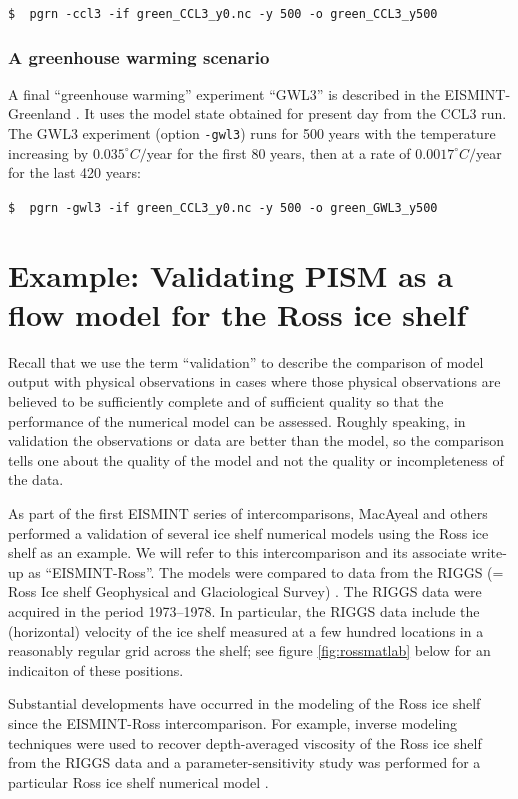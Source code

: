 \documentclass[11pt,final]{amsart}
\begin{document}
\verb|$  pgrn -ccl3 -if green_CCL3_y0.nc -y 500 -o green_CCL3_y500|

\subsubsection*{A greenhouse warming scenario}  A final ``greenhouse warming'' experiment ``GWL3'' is described in the EISMINT-Greenland \cite{RitzEISMINT}.  It uses the model state obtained for present day from the CCL3 run.  The GWL3 experiment (option \verb|-gwl3|) runs for 500 years with the temperature increasing by $0.035^\circ C/$year for the first 80 years, then at a rate of $0.0017^\circ C/$year for the last 420 years:

\verb|$  pgrn -gwl3 -if green_CCL3_y0.nc -y 500 -o green_GWL3_y500|



\clearpage\newpage
\section{Example: Validating PISM as a flow model for the Ross ice shelf}\label{sect:ross}  Recall that we use the term ``validation'' to describe the comparison of model output with physical observations in cases where those physical observations are believed to be sufficiently complete and of sufficient quality so that the performance of the numerical model can be assessed.  Roughly speaking, in validation the observations or data are better than the model, so the comparison tells one about the quality of the model and not the quality or incompleteness of the data.

As part of the first EISMINT series of intercomparisons, MacAyeal and others \cite{MacAyealetal} performed a validation of several ice shelf numerical models using the Ross ice shelf as an example.  We will refer to this intercomparison and its associate write-up \cite{MacAyealetal} as ``EISMINT-Ross''.  The models were compared to data from the RIGGS (= Ross Ice shelf Geophysical and Glaciological Survey) \cite{RIGGS1,RIGGS2}.  The RIGGS data were acquired in the period 1973--1978.   In particular, the RIGGS data include the (horizontal) velocity of the ice shelf measured at a few hundred locations in a reasonably regular grid across the shelf; see figure \ref{fig:rossmatlab} below for an indicaiton of these positions.

Substantial developments have occurred in the modeling of the Ross ice shelf since the EISMINT-Ross intercomparison.  For example, inverse modeling techniques were used to recover depth-averaged viscosity of the Ross ice shelf from the RIGGS data \cite{RommelaereMacAyeal} and a parameter-sensitivity study was performed for a particular Ross ice shelf numerical model \cite{HumbertGreveHutter}.
\end{document}
